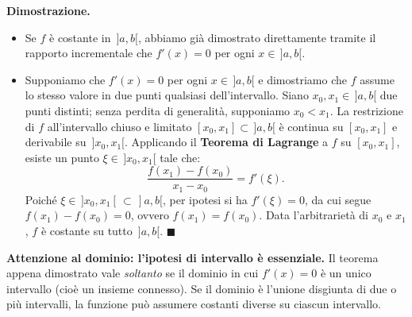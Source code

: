 \noindent\textbf{Dimostrazione.}
\begin{itemize}
    \item[$(\Rightarrow)$] Se $f$ è costante in $\,]a,b[$, abbiamo già dimostrato direttamente tramite il rapporto incrementale che $f'(x) = 0$ per ogni $x \in \,]a,b[$.
    \item[$(\Leftarrow)$] Supponiamo che $f'(x) = 0$ per ogni $x \in \,]a,b[$ e dimostriamo che $f$ assume lo stesso valore in due punti qualsiasi dell'intervallo. Siano $x_0, x_1 \in \,]a,b[$ due punti distinti; senza perdita di generalità, supponiamo $x_0 < x_1$.
    La restrizione di $f$ all'intervallo chiuso e limitato $[x_0, x_1] \subset \,]a,b[$ è continua su $[x_0, x_1]$ e derivabile su $\,]x_0, x_1[$. Applicando il \textbf{Teorema di Lagrange} a $f$ su $[x_0, x_1]$, esiste un punto $\xi \in \,]x_0, x_1[$ tale che:
    \[
        \frac{f(x_1) - f(x_0)}{x_1 - x_0} = f'(\xi).
    \]
    Poiché $\xi \in \,]x_0, x_1[\, \subset \,]a,b[$, per ipotesi si ha $f'(\xi) = 0$, da cui segue $f(x_1) - f(x_0) = 0$, ovvero $f(x_1) = f(x_0)$. Data l'arbitrarietà di $x_0$ e $x_1$, $f$ è costante su tutto $\,]a,b[$. $\blacksquare$
\end{itemize}

\noindent\textbf{Attenzione al dominio: l'ipotesi di intervallo è essenziale.} Il teorema appena dimostrato vale \emph{soltanto} se il dominio in cui $f'(x) = 0$ è un unico intervallo (cioè un insieme connesso). Se il dominio è l'unione disgiunta di due o più intervalli, la funzione può assumere costanti diverse su ciascun intervallo.

